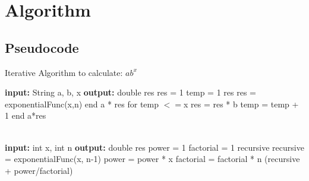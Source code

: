 \documentclass[a4paper,12pt]{report}
\begin{document}
\section{Algorithm}

\subsection{Pseudocode}

\begin{algorithm}
\caption{Iterative Algorithm to calculate: $ab^x$ }
\begin{algorithmic}
\State \textbf{input: } String a, b, x
\State \textbf{output: } double res
\State  res = 1
\State temp = 1
    \Return res
\Else
        \State res = exponentialFunc(x,n)
    \State end
\State \Return a * res
    \Else
        \State for temp $<=$x
            \State res = res * b
            \State temp = temp + 1
        \State end
        \State \Return a*res
        \EndIf
\EndIf
\EndProcedure

\\
\State \textbf{input: } int x, int n
\State \textbf{output: } double res
\State power = 1
\State factorial = 1
\State recursive
    \State {}
\EndIf
\State recursive = exponentialFunc(x, n-1)
\State power = power * x
\State factorial = factorial * n
\State \Return (recursive + power/factorial)
\EndProcedure
\\

\end{algorithmic}
\end{algorithm}
\end{document}
